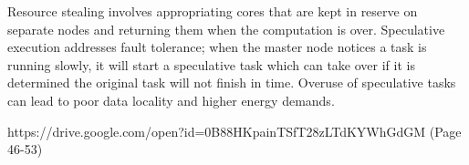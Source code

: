 Resource stealing involves appropriating cores that are kept in reserve
on separate nodes and returning them when the computation is over.
Speculative execution addresses fault tolerance; when the master node
notices a task is running slowly, it will start a speculative task which
can take over if it is determined the original task will not finish in
time. Overuse of speculative tasks can lead to poor data locality and
higher energy demands.


{https://drive.google.com/open?id=0B88HKpainTSfT28zLTdKYWhGdGM
  (Page 46-53)}

